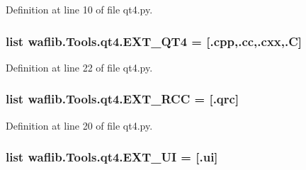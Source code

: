 Definition at line 10 of file qt4.\+py.

\subsubsection[{\texorpdfstring{E\+X\+T\+\_\+\+Q\+T4}{EXT_QT4}}]{\setlength{\rightskip}{0pt plus 5cm}list waflib.\+Tools.\+qt4.\+E\+X\+T\+\_\+\+Q\+T4 = \mbox{[}\textquotesingle{}.cpp\textquotesingle{},\textquotesingle{}.cc\textquotesingle{},\textquotesingle{}.cxx\textquotesingle{},\textquotesingle{}.C\textquotesingle{}\mbox{]}}\hypertarget{namespacewaflib_1_1_tools_1_1qt4_abdcf03052c5abde65d1eca6f7e766345}{}\label{namespacewaflib_1_1_tools_1_1qt4_abdcf03052c5abde65d1eca6f7e766345}


Definition at line 22 of file qt4.\+py.

\subsubsection[{\texorpdfstring{E\+X\+T\+\_\+\+R\+CC}{EXT_RCC}}]{\setlength{\rightskip}{0pt plus 5cm}list waflib.\+Tools.\+qt4.\+E\+X\+T\+\_\+\+R\+CC = \mbox{[}\textquotesingle{}.qrc\textquotesingle{}\mbox{]}}\hypertarget{namespacewaflib_1_1_tools_1_1qt4_ac4474e94f00290725e850706f367fd1b}{}\label{namespacewaflib_1_1_tools_1_1qt4_ac4474e94f00290725e850706f367fd1b}


Definition at line 20 of file qt4.\+py.

\subsubsection[{\texorpdfstring{E\+X\+T\+\_\+\+UI}{EXT_UI}}]{\setlength{\rightskip}{0pt plus 5cm}list waflib.\+Tools.\+qt4.\+E\+X\+T\+\_\+\+UI = \mbox{[}\textquotesingle{}.ui\textquotesingle{}\mbox{]}}\hypertarget{namespacewaflib_1_1_tools_1_1qt4_a33aa391e566ecb7090c9230378ce48d5}{}\label{namespacewaflib_1_1_tools_1_1qt4_a33aa391e566ecb7090c9230378ce48d5}


